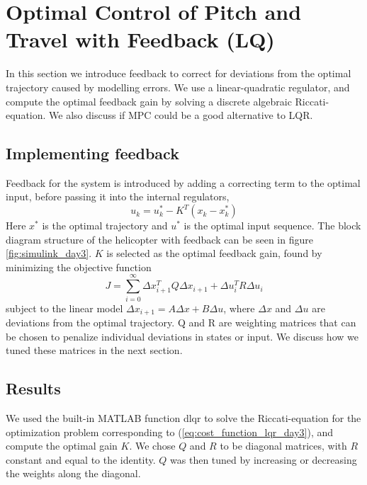 \section{Optimal Control of Pitch and Travel with Feedback (LQ)}\label{sec:prob3}
In this section we introduce feedback to correct for deviations from the optimal trajectory caused by modelling errors. We use a linear-quadratic regulator, and compute the optimal feedback gain by solving a discrete algebraic Riccati-equation. We also discuss if MPC could be a good alternative to LQR.

\subsection{Implementing feedback}
Feedback for the system is introduced by adding a correcting term to the optimal input, before passing it into the internal regulators,
\begin{equation}
    u_k = u_k^* - K^T(x_k - x_k^*)
\end{equation}
Here $x^*$ is the optimal trajectory and $u^*$ is the optimal input sequence. The block diagram structure of the helicopter with feedback can be seen in figure \ref{fig:simulink_day3}. $K$ is selected as the optimal feedback gain, found by minimizing the objective function
\begin{equation}
    \label{eq:cost_function_lqr_day3}
    J = \sum_{i=0}^\infty {\Delta x_{i+1}^TQ\Delta x_{i+1} + \Delta u_{i}^TR\Delta u_{i}}
\end{equation}
subject to the linear model $\Delta x_{i+1} = A\Delta x + B\Delta u$, where $\Delta x$ and $\Delta u$ are deviations from the optimal trajectory. Q and R are weighting matrices that can be chosen to penalize individual deviations in states or input. We discuss how we tuned these matrices in the next section.

\subsection{Results}
We used the built-in MATLAB function dlqr to solve the Riccati-equation for the optimization problem corresponding to (\ref{eq:cost_function_lqr_day3}), and compute the optimal gain $K$. We chose $Q$ and $R$ to be diagonal matrices, with $R$ constant and equal to the identity. $Q$ was then tuned by increasing or decreasing the weights along the diagonal.

